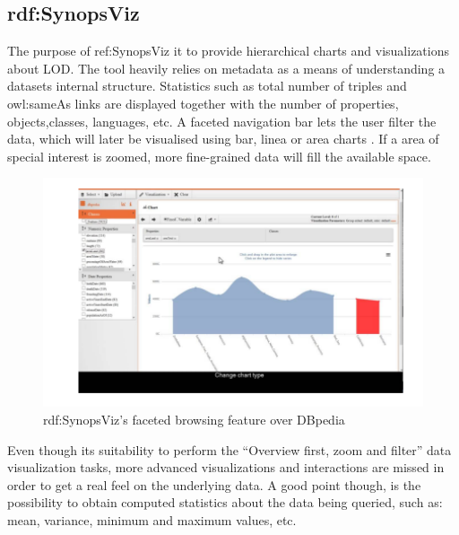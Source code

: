 \documentclass[a4paper,12pt,oneside]{report}
\begin{document}
{{{{\subsection{ rdf:SynopsViz}
{The purpose of ref:SynopsViz  it to provide hierarchical charts and visualizations about LOD. The tool heavily relies on metadata as a means of understanding a datasets internal structure. Statistics such as total number of triples and owl:sameAs links are displayed together with the number of properties, objects,classes, languages, etc. A faceted navigation bar lets the user filter the data, which will later be visualised using bar, linea or area charts . If a area of special interest is zoomed, more fine-grained data will fill the available space.
\begin{figure}[h!]
\centering
\includegraphics[width=1\textwidth]{Capture14}
\caption{rdf:SynopsViz’s faceted browsing feature over DBpedia}
\end{figure}
Even though its suitability to perform the “Overview first, zoom and filter” data visualization tasks, more advanced visualizations and interactions are missed in order to get a real feel on the underlying data. A good point though, is the possibility to obtain computed statistics about the data being queried, such as: mean, variance, minimum and maximum values, etc.}}
}}}
\end{document}
